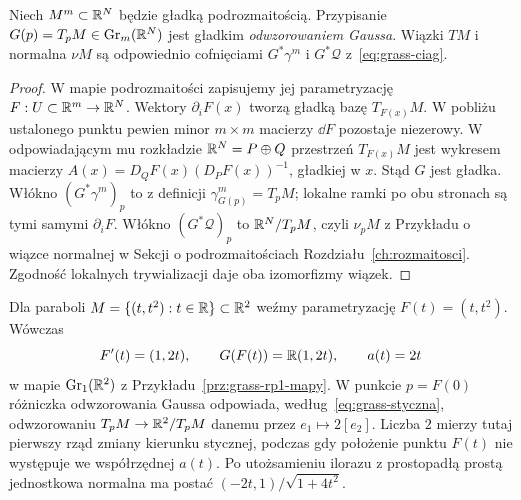 \begin{twierdzenie}
\label{thm:grass-gauss}
Niech $M^m\subset\mathbb{R}^N$ będzie gładką podrozmaitością.
Przypisanie
$G(p)=T_pM\in\operatorname{Gr}_m(\mathbb{R}^N)$
jest gładkim \emph{odwzorowaniem Gaussa}. Wiązki
$TM$ i normalna $\nu M$ są odpowiednio
cofnięciami $G^*\gamma^m$ i $G^*\mathcal Q$
z~\eqref{eq:grass-ciag}.
\end{twierdzenie}
\begin{proof}
W mapie podrozmaitości zapisujemy jej parametryzację
$F:U\subset\mathbb{R}^m\to\mathbb{R}^N$. Wektory
$\partial_iF(x)$ tworzą gładką bazę $T_{F(x)}M$.
W pobliżu ustalonego punktu pewien minor $m\times m$
macierzy $\dd F$ pozostaje niezerowy. W odpowiadającym
mu rozkładzie $\mathbb{R}^N=P\oplus Q$ przestrzeń
$T_{F(x)}M$ jest wykresem macierzy
$A(x)=D_QF(x)(D_PF(x))^{-1}$,
gładkiej w $x$. Stąd $G$ jest gładka.
Włókno $(G^*\gamma^m)_p$ to z definicji
$\gamma^m_{G(p)}=T_pM$; lokalne ramki po obu
stronach są tymi samymi $\partial_iF$.
Włókno $(G^*\mathcal Q)_p$ to
$\mathbb{R}^N/T_pM$, czyli $\nu_pM$ z
Przykładu o wiązce normalnej w Sekcji o podrozmaitościach
Rozdziału~\ref{ch:rozmaitosci}.
Zgodność lokalnych trywializacji daje oba
izomorfizmy wiązek.
\end{proof}

\begin{przyklad}
Dla paraboli $M=\{(t,t^2):t\in\mathbb{R}\}\subset\mathbb{R}^2$
weźmy parametryzację $F(t)=(t,t^2)$. Wówczas
\[
 F'(t)=(1,2t),\qquad
 G(F(t))=\mathbb{R}(1,2t),\qquad a(t)=2t
\]
w mapie $\operatorname{Gr}_1(\mathbb{R}^2)$ z
Przykładu~\ref{prz:grass-rp1-mapy}.
W punkcie $p=F(0)$ różniczka odwzorowania Gaussa
odpowiada, według~\eqref{eq:grass-styczna},
odwzorowaniu $T_pM\to\mathbb{R}^2/T_pM$ danemu przez
$e_1\mapsto2[e_2]$. Liczba $2$ mierzy tutaj
pierwszy rząd zmiany kierunku stycznej, podczas gdy
położenie punktu $F(t)$ nie występuje we współrzędnej $a(t)$.
Po utożsamieniu ilorazu z prostopadłą prostą
jednostkowa normalna ma postać
$(-2t,1)/\sqrt{1+4t^2}$.
\end{przyklad}

